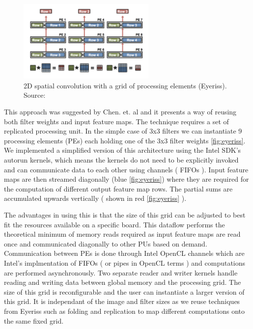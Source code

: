 \begin{figure}[h]
\centering
\includegraphics[width=0.6\textwidth]{Figures/eyeriss2}
\decoRule
\caption[2D Spatial Convolution]{ 2D spatial convolution with a grid of processing elements (Eyeriss). Source: \cite{sze2017efficient}}
\label{fig:eyeriss2}
\end{figure}

This approach was suggested by Chen. et. al \cite{eyeriss} and it presents a way of reusing both filter weights and input feature maps. The technique requires a set of replicated processing unit. In the simple case of 3x3 filters we can instantiate 9 processing elements (PEs) each holding one of the 3x3 filter weights \ref{fig:eyeriss}. We implemented a simplified version of this architecture using the Intel SDK’s autorun kernels, which means the kernels do not need to be explicitly invoked and can communicate data to each other using channels ( FIFOs ). Input feature maps are then streamed diagonally (blue \ref{fig:eyeriss}) where they are required for the computation of different output feature map rows. The partial sums are accumulated upwards vertically ( shown in red \ref{fig:eyeriss} ). 

The advantages in using this is that the size of this grid can be adjusted to best fit the resources available on a specific board. This dataflow performs the theoretical minimum of memory reads required as input feature maps are read once and communicated diagonally to other PUs based on demand. Communication between PEs is done through Intel OpenCL channels which are Intel’s implmentation of FIFOs ( or pipes in OpenCL terms ) and computations are performed asynchronously. Two separate reader and writer kernels handle reading and writing data between global memory and the processing grid. The size of this grid is reconfigurable and the user can instantiate a larger version of this grid. It is independant of the image and filter sizes as we reuse techniques from Eyeriss \cite{eyeriss} such as folding and replication to map different computations onto the same fixed grid.


